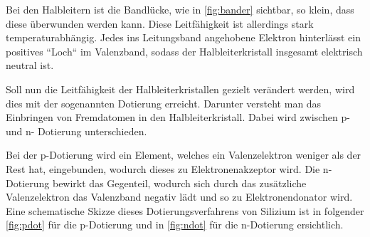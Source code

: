 \documentclass[11pt,ngerman]{scrartcl}
\begin{document}
Bei den Halbleitern ist die Bandlücke, wie in \autoref{fig:bander} sichtbar, so
klein, dass diese überwunden werden kann. Diese Leitfähigkeit ist allerdings
stark temperaturabhängig. Jedes ins Leitungsband angehobene Elektron
hinterlässt ein positives ``Loch`` im Valenzband, sodass der Halbleiterkristall
insgesamt elektrisch neutral ist.

\vspace{2mm}

Soll nun die Leitfähigkeit der Halbleiterkristallen gezielt verändert werden,
wird dies mit der sogenannten Dotierung erreicht. Darunter versteht man das
Einbringen von Fremdatomen in den Halbleiterkristall. Dabei wird zwischen p-
und n- Dotierung unterschieden.

\vspace{2mm}

Bei der p-Dotierung wird ein Element, welches ein Valenzelektron weniger als der Rest hat, eingebunden, wodurch dieses zu Elektronenakzeptor wird. Die n-Dotierung bewirkt das Gegenteil, wodurch sich durch das zusätzliche Valenzelektron das Valenzband negativ lädt und so zu Elektronendonator wird. Eine schematische Skizze dieses Dotierungsverfahrens von Silizium ist in folgender \autoref{fig:pdot} für die p-Dotierung und in \autoref{fig:ndot} für die n-Dotierung ersichtlich.
\end{document}

